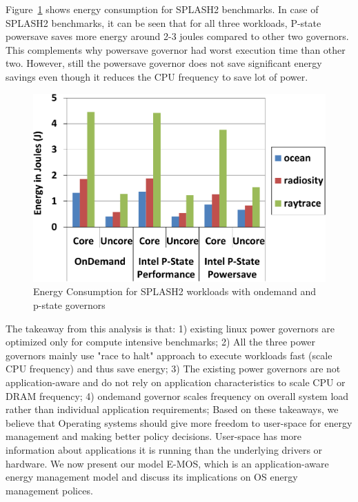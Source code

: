 Figure~\ref{fig:splash-energy} shows energy consumption for SPLASH2 benchmarks.
In case of SPLASH2 benchmarks, it can be seen that for all three workloads, P-state powersave saves more
energy around 2-3 joules compared to other two governors. This complements
why powersave governor had worst execution time than other two. However, still 
the powersave governor does not save significant energy savings even though it reduces 
the CPU frequency to save lot of power.

\begin{figure}[h]
  \begin{center}
\includegraphics[width=\linewidth]{figs/def-drivers-splash-crop.pdf}
  \end{center}
  \vspace{-0.1in}
  \caption{Energy Consumption for SPLASH2 workloads with ondemand and p-state governors}
  \label{fig:splash-energy}
\end{figure}

\vspace{-0.1in}
The takeaway from this analysis is that: 1) existing linux power governors 
are optimized only for compute intensive benchmarks;
2) All the three power governors mainly use "race to halt" approach to execute workloads 
fast (scale CPU frequency) and thus save energy;
3) The existing power governors are not application-aware and do not rely
on application characteristics to scale CPU or DRAM frequency;
4) ondemand governor scales frequency on overall system load
rather than individual application requirements;
Based on these takeaways, we believe that Operating systems
should give more freedom to user-space for energy management
and making better policy decisions. User-space has more 
information about applications it is running than
the underlying drivers or hardware.
We now present our model E-MOS, which is an application-aware
energy management model and discuss its implications on OS energy management polices.

